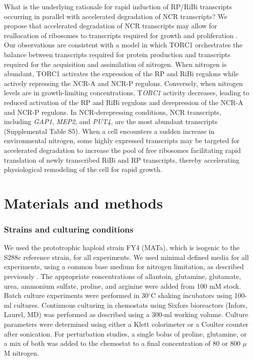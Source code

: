 What is the underlying rationale
for rapid induction of RP/RiBi transcripts occurring in parallel with
accelerated degradation of NCR transcripts? We propose that
accelerated degradation of NCR transcripts may allow for reallocation
of ribosomes to transcripts required for growth and proliferation
\parencite{kief1981coordinate,lee2011dynamic}. Our observations are
consistent with a model in which TORC1 orchestrates the balance
between transcripts required for protein production and transcripts
required for the acquisition and assimilation of nitrogen. When
nitrogen is abundant, TORC1 activates the expression of the RP and
RiBi regulons while actively repressing the NCR-A and NCR-P regulons.
Conversely, when nitrogen levels are in growth-limiting
concentrations, T\textit{ORC1} activity decreases, leading to reduced
activation of the RP and RiBi regulons and derepression of the NCR-A
and NCR-P regulons. In NCR-derepressing conditions, NCR transcripts,
including \textit{GAP1}, \textit{MEP2}, and \textit{PUT4}, 
are the most abundant transcripts
(Supplemental Table S5). When a cell encounters a sudden increase in
environmental nitrogen, some highly expressed transcripts may be
targeted for accelerated degradation to increase the pool of free
ribosomes facilitating rapid translation of newly transcribed RiBi and
RP transcripts, thereby accelerating physiological remodeling of the
cell for rapid growth.  

\section{Materials and methods}

\subsubsection{Strains and culturing conditions}

We used the prototrophic haploid strain FY4 (MATa), which
is isogenic to the S288c reference strain, for all experiments. We
used minimal defined media for all experiments, using a common base
medium for nitrogen limitation, as described previously 
\parencite{brauer2008coordination,boer2010growth}. The appropriate concentrations of
allantoin, glutamine, glutamate, urea, ammonium sulfate, proline, and
arginine were added from 100 mM stock. Batch culture experiments were
performed in 30$^{\circ}$C shaking incubators using 100-ml cultures. Continuous
culturing in chemostats using Sixfors bioreactors (Infors, Laurel, MD)
was performed as described 
\parencite{brauer2008coordination,boer2010growth}
using a 300-ml working volume. Culture parameters were determined
using either a Klett colorimeter or a Coulter counter after
sonication. For perturbation studies, a single bolus of proline,
glutamine, or a mix of both was added to the chemostat to a final
concentration of 80 or 800 $\mu$M nitrogen.  

